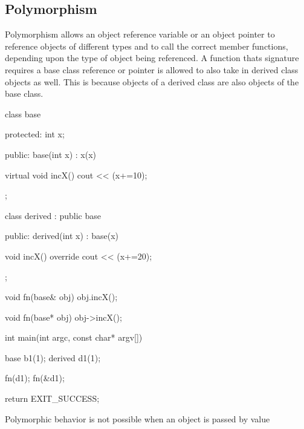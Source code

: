 \documentclass{report}
\begin{document}
    \pagebreak 
    \subsection{Polymorphism}
    \bigbreak \noindent 
    \begin{concept}
       Polymorphism allows an object reference variable or an object pointer to reference objects of different types and to call the correct member functions, depending upon the type of object being referenced. 
       \bigbreak \noindent 
       A function thats signature requires a base class reference or pointer is allowed to also take in derived class objects as well. This is because objects of a derived class are also objects of the base class.
    \end{concept}
    \bigbreak \noindent 
    \begin{cppcode}
        class base {
        protected:
            int x;

        public: 
            base(int x) : x(x) {}

            virtual void incX() { cout << (x+=10); }
        };

        class derived : public base {
        public: 
            derived(int x) : base(x) {}

            void incX() override{
                cout << (x+=20);
            }
        };

        void fn(base& obj) { obj.incX(); }

        void fn(base* obj) { obj->incX(); }

        int main(int argc, const char* argv[]) {

            base b1(1);
            derived d1(1);

            fn(d1);
            fn(&d1);

            return EXIT_SUCCESS;
        }
    \end{cppcode}
    \bigbreak \noindent 
    \begin{notebox}
        Polymorphic behavior is not possible when an object is passed by value
    \end{notebox}
    
    
    \pagebreak
\end{document}
